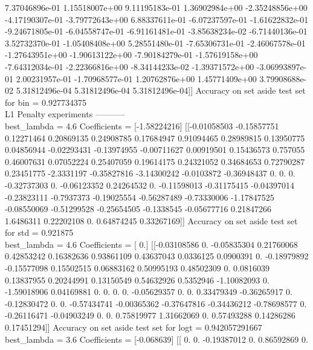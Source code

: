 \documentclass[pdftex,11pt]{article}
\begin{document}
    7.37046896e-01   1.15518007e+00   9.11195183e-01   1.36902984e+00
   -2.35248856e+00  -4.17190307e-01  -3.79772643e+00   6.88337611e-01
   -6.07237597e-01  -1.61622832e-01  -9.24671805e-01  -6.04558747e-01
   -6.91161481e-01  -3.85638234e-02  -6.71440136e-01   3.52732370e-01
   -1.05408408e+00   5.28551480e-01  -7.65306731e-01  -2.46067578e-01
   -1.27643951e+00  -1.90613122e+00  -7.90184279e-01  -1.57619158e+00
   -7.64312034e-01  -2.22366816e+00  -8.34144233e-02  -1.39371572e+00
   -3.06993897e-01   2.00231957e-01  -1.70968577e-01   1.20762876e+00
    1.45771409e+00   3.79908688e-02   5.31812496e-04   5.31812496e-04
    5.31812496e-04]]
Accuracy on set aside test set for  bin  =  0.927734375\\
L1 Penalty experiments -----------\\
best\_lambda =  4.6
Coefficients =  [-1.58224216] [[-0.01058503 -0.15857751  0.12271464  0.20869135  0.24908785  0.17684947
   0.91094465  0.28989815  0.13950775  0.04856944 -0.02293431 -0.13974955
  -0.00711627  0.00919501  0.15436573  0.757055    0.46007631  0.07052224
   0.25407059  0.19614175  0.24321052  0.34684653  0.72790287  0.23451775
  -2.3331197  -0.35827816 -3.14300242 -0.0103872  -0.36948437  0.          0.
   0.         -0.32737303  0.         -0.06123352  0.24264532  0.
  -0.11598013 -0.31175415 -0.04397014 -0.23823111 -0.7937373  -0.19025554
  -0.56287489 -0.73330006 -1.17847525 -0.08550069 -0.51299528 -0.25654505
  -0.1338545  -0.05677716  0.21847266  1.6486311   0.22202108  0.
   0.64874245  0.33267169]]
Accuracy on set aside test set for  std  =  0.921875\\
best\_lambda =  4.6
Coefficients =  [ 0.] [[-0.03108586  0.         -0.05835304  0.21760068  0.42853242  0.16382636
   0.93861109  0.43637043  0.0336125   0.0900391   0.         -0.18979892
  -0.15577098  0.15502515  0.06883162  0.50995193  0.48502309  0.
   0.0816039   0.13837955  0.20244991  0.13150549  0.54632926  0.5352946
  -1.10082093  0.         -1.59018906  0.04169881  0.          0.          0.
   0.         -0.05629357  0.          0.          0.33479349 -0.36265917
   0.         -0.12830472  0.          0.         -0.57434741 -0.00365362
  -0.37647816 -0.34436212 -0.78698577  0.         -0.26116471 -0.04903249
   0.          0.          0.75819977  1.31662069  0.          0.57493288
   0.14286286  0.17451294]]
Accuracy on set aside test set for  logt  =  0.942057291667\\
best\_lambda =  3.6
Coefficients =  [-0.068639] [[ 0.          0.         -0.19387012  0.          0.86592869  0.
\end{document}
